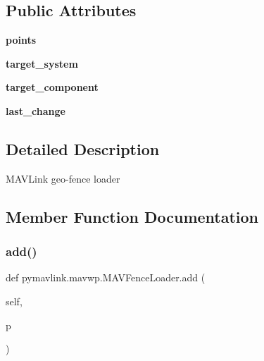 \subsection*{Public Attributes}
\begin{DoxyCompactItemize}
\item 
\mbox{\label{classpymavlink_1_1mavwp_1_1MAVFenceLoader_a280180d0d631199133ba120b55fc74ee}} 
{\bfseries points}
\item 
\mbox{\label{classpymavlink_1_1mavwp_1_1MAVFenceLoader_ad95b9bdad05fdf89e63f52ffd2c8aa87}} 
{\bfseries target\+\_\+system}
\item 
\mbox{\label{classpymavlink_1_1mavwp_1_1MAVFenceLoader_a38751985c2a37046971dcd69a83b8370}} 
{\bfseries target\+\_\+component}
\item 
\mbox{\label{classpymavlink_1_1mavwp_1_1MAVFenceLoader_a9d2edef837016a734557e430f25b3158}} 
{\bfseries last\+\_\+change}
\end{DoxyCompactItemize}


\subsection{Detailed Description}
\begin{DoxyVerb}MAVLink geo-fence loader\end{DoxyVerb}
 

\subsection{Member Function Documentation}
\mbox{\label{classpymavlink_1_1mavwp_1_1MAVFenceLoader_a58e43bc724a67d155e5746e7abf3d31e}} 
\subsubsection{\texorpdfstring{add()}{add()}}
{\footnotesize\ttfamily def pymavlink.\+mavwp.\+M\+A\+V\+Fence\+Loader.\+add (\begin{DoxyParamCaption}\item[{}]{self,  }\item[{}]{p }\end{DoxyParamCaption})}

